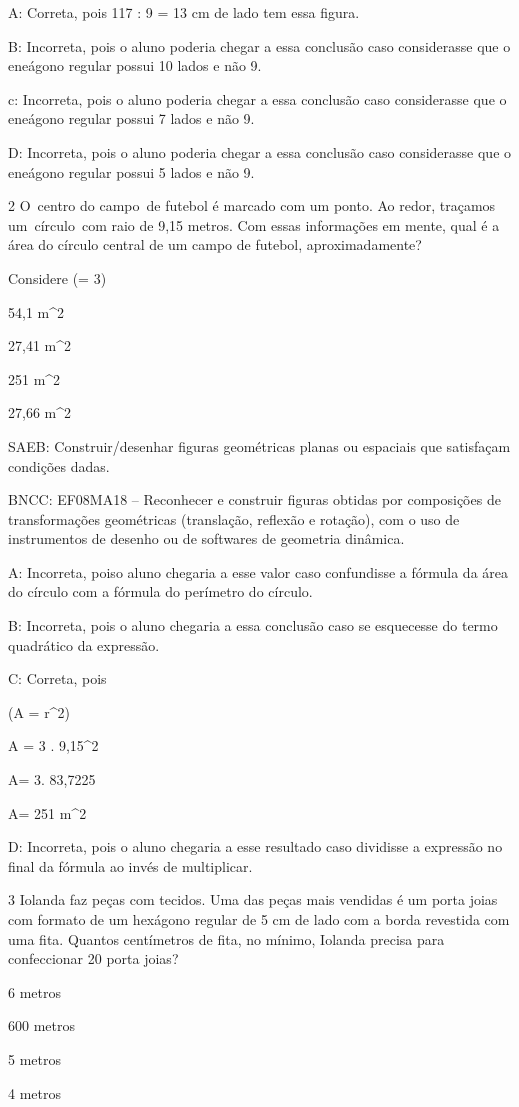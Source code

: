 {A: Correta, pois 117 : 9 = 13 cm de lado tem essa figura.

B: Incorreta, pois o aluno poderia chegar a essa conclusão caso
considerasse que o eneágono regular possui 10 lados e não 9.

c: Incorreta, pois o aluno poderia chegar a essa conclusão caso
considerasse que o eneágono regular possui 7 lados e não 9.

D: Incorreta, pois o aluno poderia chegar a essa conclusão caso
considerasse que o eneágono regular possui 5 lados e não 9.

\num{2} O~centro do campo~de futebol é marcado com um ponto. Ao redor,
traçamos um~círculo~com raio de 9,15 metros. Com essas informações em
mente, qual é a área do círculo central de um campo de futebol,
aproximadamente?

Considere (\pi = 3)
\item 54,1 m^2
\item 27,41 m^2
\item 251 m^2
\item 27,66 m^2

SAEB: Construir/desenhar figuras geométricas planas ou espaciais que
satisfaçam condições dadas.

BNCC: EF08MA18 -- Reconhecer e construir figuras obtidas por composições
de transformações geométricas (translação, reflexão e rotação), com o
uso de instrumentos de desenho ou de softwares de geometria dinâmica.

A: Incorreta, poiso aluno chegaria a esse valor caso confundisse a
fórmula da área do círculo com a fórmula do perímetro do círculo.

B: Incorreta, pois o aluno chegaria a essa conclusão caso se esquecesse
do termo quadrático da expressão.

C: Correta, pois

(A = \pi r^{2})

A = 3 . 9,15^2

A= 3. 83,7225

A= 251 m^2

D: Incorreta, pois o aluno chegaria a esse resultado caso dividisse a
expressão no final da fórmula ao invés de multiplicar.

\num{3} Iolanda faz peças com tecidos. Uma das peças mais vendidas é um porta
joias com formato de um hexágono regular de 5 cm de lado com a borda
revestida com uma fita. Quantos centímetros de fita, no mínimo, Iolanda
precisa para confeccionar 20 porta joias?
\item 6 metros
\item 600 metros
\item 5 metros
\item 4 metros

}
